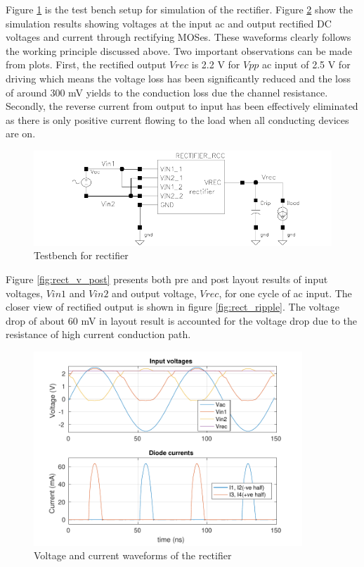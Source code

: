 \documentclass[12pt,a4paper,UKenglish]{report}
\begin{document}
Figure \ref{rect_tb} is the test bench setup for simulation of the rectifier. Figure \ref{rect_plot} show the simulation results showing voltages at the input ac and output rectified DC 
voltages and current through rectifying MOSes. These  
waveforms clearly follows the working principle discussed above. Two important observations can be made from 
plots. First, the rectified output $Vrec$ is 2.2 V for $Vpp$ ac input of 2.5 V for driving which means the 
voltage loss has been significantly reduced and the loss of around 300 mV yields to the conduction loss due 
the channel resistance. Secondly, the reverse current from output to input has been effectively eliminated as 
there is only positive current flowing to the load when all conducting devices 
are on.  \\

\begin{figure}[!htbp] %
   \centering
   \includegraphics[width=\textwidth]{img/rectifier_testbench.pdf} 
   \caption{Testbench for rectifier}
   \label{rect_tb}
\end{figure}

Figure  \ref{fig:rect_v_post}  presents both pre and post layout results of input voltages, $Vin1$ and $Vin2$  and output voltage, $Vrec$, for one cycle of ac input. The closer view of rectified output is shown in figure \ref{fig:rect_ripple}. The voltage drop of about 60 mV in layout result is accounted for the voltage drop due to 
the resistance of high current conduction path. \\

\begin{figure}[H] %
   \centering
   \includegraphics[width=0.9\textwidth]{img/rectifier_VI.pdf} 
   \caption{Voltage and current waveforms of the rectifier}
   \label{rect_plot}
\end{figure}
\end{document}
